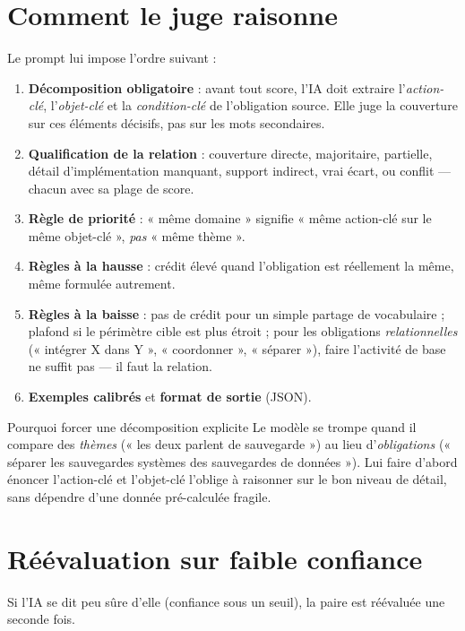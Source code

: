 \documentclass[11pt,a4paper]{report}
\begin{document}
\section{Comment le juge raisonne}
Le prompt lui impose l'ordre suivant :
\begin{enumerate}[nosep]
  \item \textbf{Décomposition obligatoire} : avant tout score, l'IA doit extraire l'\emph{action-clé}, l'\emph{objet-clé} et la \emph{condition-clé} de l'obligation source. Elle juge la couverture sur ces éléments décisifs, pas sur les mots secondaires.
  \item \textbf{Qualification de la relation} : couverture directe, majoritaire, partielle, détail d'implémentation manquant, support indirect, vrai écart, ou conflit — chacun avec sa plage de score.
  \item \textbf{Règle de priorité} : « même domaine » signifie « même action-clé sur le même objet-clé », \emph{pas} « même thème ».
  \item \textbf{Règles à la hausse} : crédit élevé quand l'obligation est réellement la même, même formulée autrement.
  \item \textbf{Règles à la baisse} : pas de crédit pour un simple partage de vocabulaire ; plafond si le périmètre cible est plus étroit ; pour les obligations \emph{relationnelles} (« intégrer X dans Y », « coordonner », « séparer »), faire l'activité de base ne suffit pas — il faut la relation.
  \item \textbf{Exemples calibrés} et \textbf{format de sortie} (JSON).
\end{enumerate}

\begin{keybox}{Pourquoi forcer une décomposition explicite}
Le modèle se trompe quand il compare des \emph{thèmes} (« les deux parlent de sauvegarde ») au lieu d'\emph{obligations} (« séparer les sauvegardes systèmes des sauvegardes de données »). Lui faire d'abord énoncer l'action-clé et l'objet-clé l'oblige à raisonner sur le bon niveau de détail, sans dépendre d'une donnée pré-calculée fragile.
\end{keybox}

\section{Réévaluation sur faible confiance}
Si l'IA se dit peu sûre d'elle (confiance sous un seuil), la paire est réévaluée une seconde fois.
\end{document}
